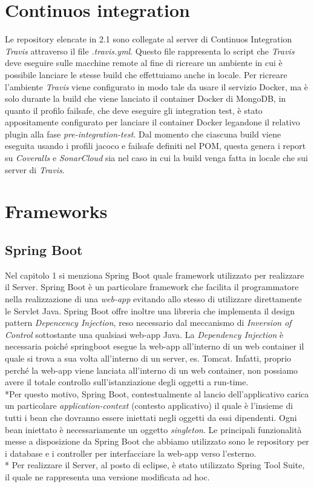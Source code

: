 \section{Continuos integration}
Le repository elencate in 2.1 sono collegate al server di Continuos Integration \emph{Travis} attraverso il file \emph{.travis.yml}. Questo file rappresenta lo script che \emph{Travis} deve eseguire sulle macchine remote al fine di ricreare un ambiente in cui \`e possibile lanciare le stesse build che effettuiamo anche in locale. Per ricreare l'ambiente \emph{Travis} viene configurato in modo tale da usare il servizio Docker, ma \`e solo durante la build che viene lanciato il container Docker di MongoDB, in quanto il profilo failsafe, che deve eseguire gli integration test, \`e stato appositamente configurato per lanciare il container Docker legandone il relativo plugin alla fase \emph{pre-integration-test}. Dal momento che ciascuna build viene eseguita usando i profili jacoco e failsafe definiti nel POM, questa genera i report su \emph{Coveralls} e \emph{SonarCloud} sia nel caso in cui la build venga fatta in locale che sui server di \emph{Travis}. 
\section{Frameworks}
\subsection{Spring Boot}
Nel capitolo 1 si menziona Spring Boot quale framework utilizzato per realizzare il Server. Spring Boot \`e un particolare framework che facilita il programmatore nella realizzazione di una \emph{web-app} evitando allo stesso di utilizzare direttamente le Servlet Java. Spring Boot offre inoltre una libreria che implementa il design pattern \emph{Depencency Injection}, reso necessario dal meccanismo di \emph{Inversion of Control} sottostante una qualsiasi web-app Java. La \emph{Dependency Injection} \`e necessaria poich\'e springboot esegue la web-app all'interno di un web container il quale si trova a sua volta all'interno di un server, es. Tomcat. Infatti, proprio perch\'e la web-app viene lanciata all'interno di un web container, non possiamo avere il totale controllo sull'istanziazione degli oggetti a run-time.\\*Per questo motivo, Spring Boot, contestualmente al lancio dell'applicativo carica un particolare \emph{application-context} (contesto applicativo) il quale \`e l'insieme di tutti i bean che dovranno essere iniettati negli oggetti da essi dipendenti. Ogni bean iniettato \`e necessariamente un oggetto \emph{singleton}.
Le principali funzionalit\`a messe a disposizione da Spring Boot che abbiamo utilizzato sono le repository per i database e i controller per interfacciare la web-app verso l'esterno.\\*
Per realizzare il Server, al posto di eclipse, \`e stato utilizzato Spring Tool Suite, il quale ne rappresenta una versione modificata ad hoc.
